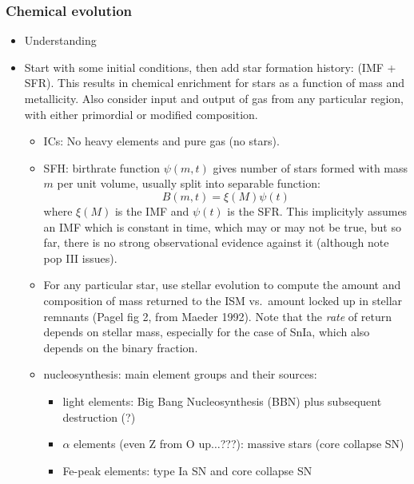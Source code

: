 \documentclass{article}
\begin{document}
\subsubsection{Chemical evolution}
\begin{itemize} %
    \item Understanding
    \item Start with some initial conditions,
        then add star formation history: (IMF + SFR). This results
        in chemical enrichment for stars as a function of mass and
        metallicity. Also consider input and output of gas from any
        particular region, with either primordial or modified
        composition.
        \begin{itemize} %
            \item ICs: No heavy elements and pure gas (no stars).
            \item SFH: birthrate function $\psi(m,t)$ gives
                number of stars formed with mass $m$ per unit
                volume, usually split into separable function:
                $$ B(m,t) = \xi(M)\psi(t) $$
                where $\xi(M)$ is the IMF and $\psi(t)$ is the SFR\@.
                This implicityly assumes an IMF which is constant
                in time, which may or may not be true, but so far,
                there is no strong observational evidence against
                it (although note pop III issues).
            \item For any particular star, use stellar evolution
                to compute the amount and composition of mass
                returned to the ISM vs.\ amount locked up in stellar
                remnants (Pagel fig 2, from Maeder 1992). Note that
                the \emph{rate} of return depends on stellar mass,
                especially for the case of SnIa, which also depends
                on the binary fraction.
            \item nucleosynthesis: main element groups and their sources:
            \begin{itemize} %
                \item light elements: Big Bang Nucleosynthesis (BBN)
                    plus subsequent destruction (?)
                \item $\alpha$ elements (even Z from O up$\ldots$???):
                        massive stars (core collapse SN)
                \item Fe-peak elements: type Ia SN and core collapse SN

\end{itemize}
\end{itemize}
\end{itemize}
\end{document}
